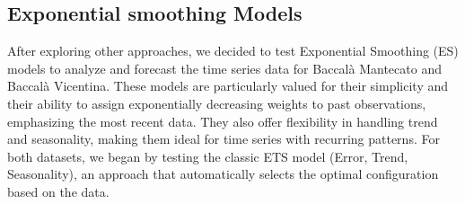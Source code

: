 \documentclass[10pt,twocolumn,letterpaper]{article}
\begin{document}
\subsection{Exponential smoothing Models}
After exploring other approaches, we decided to test Exponential Smoothing (ES) models to analyze and forecast the time series data for Baccalà Mantecato and Baccalà Vicentina. These models are particularly valued for their simplicity and their ability to assign exponentially decreasing weights to past observations, emphasizing the most recent data. They also offer flexibility in handling trend and seasonality, making them ideal for time series with recurring patterns.
For both datasets, we began by testing the classic ETS model (Error, Trend, Seasonality), an approach that automatically selects the optimal configuration based on the data.
\end{document}
